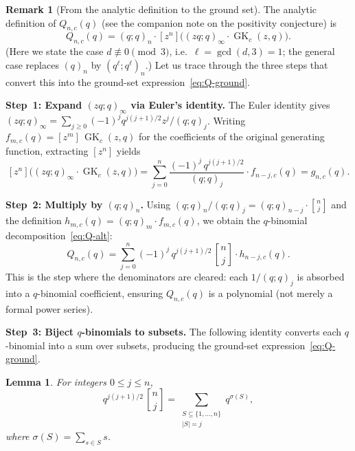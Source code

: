 \documentclass[11pt]{article}
\newcommand{\GK}{\operatorname{GK}}
\newcommand{\qpoch}[2]{(#1;#2)_\infty}
\newcommand{\qpochn}[3]{(#1;#2)_{#3}}
\newcommand{\qbin}[2]{\genfrac{[}{]}{0pt}{}{#1}{#2}}
\theoremstyle{plain}
\newtheorem{lemma}[theorem]{Lemma}
\theoremstyle{definition}
\newtheorem{remark}[theorem]{Remark}
\begin{document}
\begin{remark}[From the analytic definition to the ground set]
\label{rem:analytic-to-ground}
The analytic definition of $Q_{n,c}(q)$ (see the companion note on the
positivity conjecture) is
\begin{equation}\label{eq:Q-analytic}
  Q_{n,c}(q) = \qpochn{q}{q}{n}
  \cdot [z^n]\!\bigl(\qpoch{zq}{q} \cdot \GK_c(z,q)\bigr).
\end{equation}
(Here we state the case $d \not\equiv 0 \pmod{3}$, i.e.\ $\ell =
\gcd(d,3) = 1$; the general case replaces $(q)_n$ by
$(q^\ell;q^\ell)_n$.)
Let us trace through the three steps that convert this into the
ground-set expression~\eqref{eq:Q-ground}.

\medskip
\noindent\textbf{Step~1: Expand $\qpoch{zq}{q}$ via Euler's identity.}
The Euler identity gives
$\qpoch{zq}{q} = \sum_{j \geq 0} (-1)^j q^{j(j+1)/2} z^j /
\qpochn{q}{q}{j}$.
Writing $f_{m,c}(q) = [z^m]\,\GK_c(z,q)$ for the coefficients of the
original generating function, extracting $[z^n]$ yields
\[
  [z^n]\!\bigl(\qpoch{zq}{q} \cdot \GK_c(z,q)\bigr)
  = \sum_{j=0}^{n} \frac{(-1)^j\, q^{j(j+1)/2}}{\qpochn{q}{q}{j}}
    \cdot f_{n-j,c}(q)
  = g_{n,c}(q).
\]

\noindent\textbf{Step~2: Multiply by $\qpochn{q}{q}{n}$.}
Using $\qpochn{q}{q}{n}/\qpochn{q}{q}{j} =
\qpochn{q}{q}{n-j} \cdot \qbin{n}{j}$ and the definition
$h_{m,c}(q) = \qpochn{q}{q}{m} \cdot f_{m,c}(q)$, we obtain the
$q$-binomial decomposition~\eqref{eq:Q-alt}:
\[
  Q_{n,c}(q) = \sum_{j=0}^{n} (-1)^j\, q^{j(j+1)/2}\,
  \qbin{n}{j} \cdot h_{n-j,c}(q).
\]
This is the step where the denominators are cleared: each
$1/\qpochn{q}{q}{j}$ is absorbed into a $q$-binomial coefficient,
ensuring $Q_{n,c}(q)$ is a polynomial (not merely a formal power series).

\medskip
\noindent\textbf{Step~3: Biject $q$-binomials to subsets.}
The following identity converts each $q$-binomial into a sum over
subsets, producing the ground-set expression~\eqref{eq:Q-ground}.
\end{remark}

\begin{lemma}\label{lem:qbin-subsets}
For integers $0 \leq j \leq n$,
\begin{equation}\label{eq:qbin-subsets}
  q^{j(j+1)/2}\,\qbin{n}{j}
  = \sum_{\substack{S \subseteq \{1,\ldots,n\} \\ |S| = j}} q^{\sigma(S)},
\end{equation}
where $\sigma(S) = \sum_{s \in S} s$.
\end{lemma}
\end{document}
